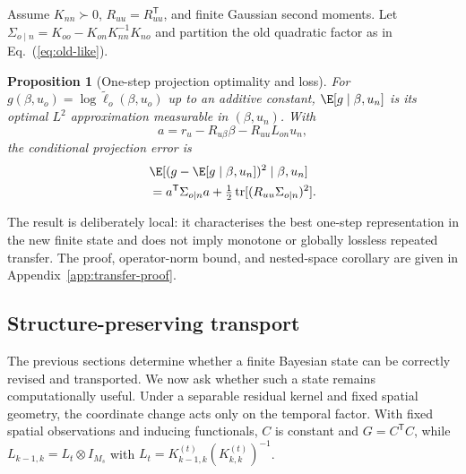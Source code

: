 \documentclass[twoside]{article}
\newcommand{\trans}{\mathsf T}
\newtheorem{proposition}{Proposition}
\begin{document}
Assume $K_{nn}\succ0$, $R_{uu}=R_{uu}^{\trans}$, and finite Gaussian second moments. Let
$\Sigma_{o\mid n}=K_{oo}-K_{on}K_{nn}^{-1}K_{no}$ and partition the old quadratic factor as in Eq.~(\ref{eq:old-like}).
\begin{proposition}[One-step projection optimality and loss]
\label{prop:transfer-mse}
For $g(\beta,u_o)=\log\widetilde\ell_o(\beta,u_o)$ up to an additive constant, $\E[g\mid\beta,u_n]$ is its optimal $L^2$ approximation measurable in $(\beta,u_n)$. With
\[
 a=r_u-R_{u\beta}\beta-R_{uu}L_{on}u_n,
\]
the conditional projection error is
\begin{equation}
\begin{aligned}
 &\E[(g-\E[g\mid\beta,u_n])^2\mid\beta,u_n] \\
 &=a^{\trans}\Sigma_{o\mid n}a
 +\tfrac12\operatorname{tr}[(R_{uu}\Sigma_{o\mid n})^2].
\end{aligned}
\label{eq:transfer-mse}
\end{equation}
\end{proposition}
The result is deliberately local: it characterises the best one-step representation in the new finite state and does not imply monotone or globally lossless repeated transfer. The proof, operator-norm bound, and nested-space corollary are given in Appendix~\ref{app:transfer-proof}.

\subsection{Structure-preserving transport}

The previous sections determine whether a finite Bayesian state can be correctly revised and transported. We now ask whether such a state remains computationally useful. Under a separable residual kernel and fixed spatial geometry, the coordinate change acts only on the temporal factor. With fixed spatial observations and inducing functionals, $C$ is constant and $G=C^{\trans}C$, while
$L_{k-1,k}=L_t\otimes I_{M_s}$ with
$L_t=K_{k-1,k}^{(t)}(K_{k,k}^{(t)})^{-1}$.
\end{document}

